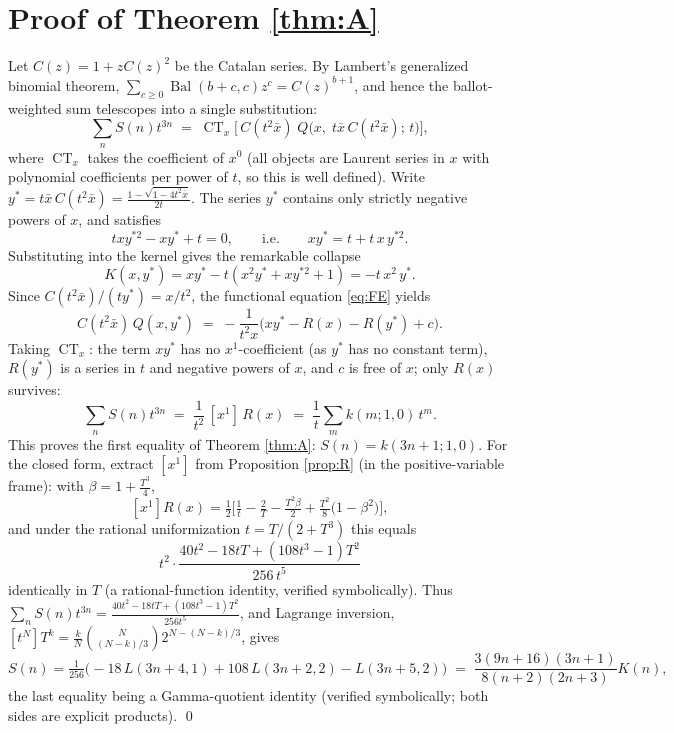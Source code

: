 \documentclass[11pt]{article}
\newcommand{\bx}{\bar x}\newcommand{\by}{\bar y}
\newcommand{\CT}{\operatorname{CT}}
\newcommand{\Bal}{\operatorname{Bal}}
\begin{document}
\section{Proof of Theorem \ref{thm:A}}\label{sec:lemA}
Let $C(z) = 1+zC(z)^2$ be the Catalan series. By Lambert's generalized binomial theorem, $\sum_{c\ge0}\Bal(b+c,c)z^c = C(z)^{b+1}$, and hence the ballot-weighted sum telescopes into a single substitution:
\[ \sum_{n} S(n)t^{3n} \;=\; \CT_x\Big[\,C(t^2\bx)\; Q\big(x,\;t\bx\,C(t^2\bx);\,t\big)\Big], \]
where $\CT_x$ takes the coefficient of $x^0$ (all objects are Laurent series in $x$ with polynomial coefficients per power of $t$, so this is well defined). Write $y^* = t\bx\,C(t^2\bx) = \frac{1-\sqrt{1-4t^2\bx}}{2t}$. The series $y^*$ contains only strictly negative powers of $x$, and satisfies
\[ txy^{*2} - xy^* + t = 0,\qquad\text{i.e.}\qquad xy^* = t + t\,x\,y^{*2}. \]
Substituting into the kernel gives the remarkable collapse
\[ K(x,y^*) = xy^* - t(x^2y^* + x y^{*2} + 1) = -t\,x^2\,y^* . \]
Since $C(t^2\bx)/(t y^*) = x/t^2$, the functional equation \eqref{eq:FE} yields
\[ C(t^2\bx)\,Q(x,y^*) \;=\; -\frac{1}{t^2 x}\Big(xy^* - R(x) - R(y^*) + c\Big). \]
Taking $\CT_x$: the term $xy^*$ has no $x^1$-coefficient (as $y^*$ has no constant term), $R(y^*)$ is a series in $t$ and negative powers of $x$, and $c$ is free of $x$; only $R(x)$ survives:
\begin{equation}\label{eq:collapse}
\sum_n S(n)t^{3n} \;=\; \frac{1}{t^2}\,[x^1]\,R(x)\;=\;\frac1t\sum_m k(m;1,0)\,t^m .
\end{equation}
This proves the first equality of Theorem \ref{thm:A}: $S(n) = k(3n+1;1,0)$. For the closed form, extract $[x^1]$ from Proposition \ref{prop:R} (in the positive-variable frame): with $\beta = 1+\tfrac{T^3}{4}$,
\[ [x^1]R(x) = \tfrac12\Big[\tfrac1t - \tfrac2T - \tfrac{T^2\beta}{2} + \tfrac{T^2}{8}\big(1-\beta^2\big)\Big], \]
and under the rational uniformization $t = T/(2+T^3)$ this equals
\[ t^2\cdot\frac{40t^2 - 18tT + (108t^3-1)T^2}{256\,t^{5}} \]
identically in $T$ (a rational-function identity, verified symbolically). Thus $\sum_n S(n)t^{3n} = \frac{40t^2-18tT+(108t^3-1)T^2}{256t^5}$, and Lagrange inversion, $[t^N]T^k = \frac kN\binom{N}{(N-k)/3}2^{N-(N-k)/3}$, gives
\[ S(n) = \tfrac{1}{256}\Big(-18\,L(3n{+}4,1) + 108\,L(3n{+}2,2) - L(3n{+}5,2)\Big) \;=\; \frac{3(9n+16)(3n+1)}{8(n+2)(2n+3)}K(n), \]
the last equality being a Gamma-quotient identity (verified symbolically; both sides are explicit products). \qed
\end{document}
